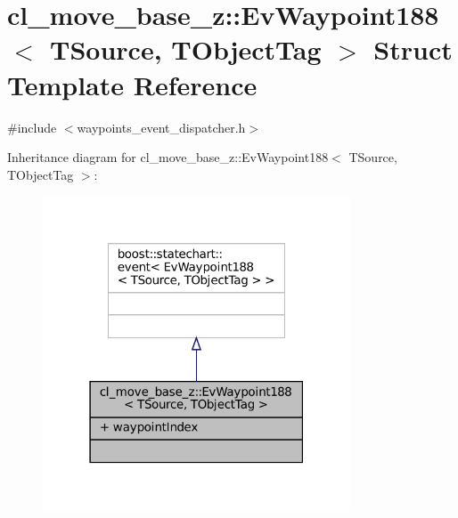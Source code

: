 \hypertarget{structcl__move__base__z_1_1EvWaypoint188}{}\section{cl\+\_\+move\+\_\+base\+\_\+z\+:\+:Ev\+Waypoint188$<$ T\+Source, T\+Object\+Tag $>$ Struct Template Reference}
\label{structcl__move__base__z_1_1EvWaypoint188}


{\ttfamily \#include $<$waypoints\+\_\+event\+\_\+dispatcher.\+h$>$}



Inheritance diagram for cl\+\_\+move\+\_\+base\+\_\+z\+:\+:Ev\+Waypoint188$<$ T\+Source, T\+Object\+Tag $>$\+:
\nopagebreak
\begin{figure}[H]
\begin{center}
\leavevmode
\includegraphics[width=259pt]{structcl__move__base__z_1_1EvWaypoint188__inherit__graph}
\end{center}
\end{figure}


